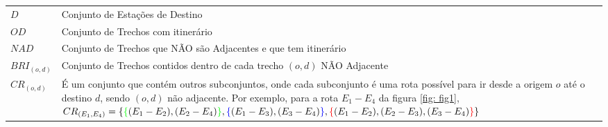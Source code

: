 \begin{table}[H]
\begin{tabular}{p{2cm} p{9.5cm} p{3.2cm}}
		$D$                & Conjunto de Estações de Destino                                                                                                                                                                                                                                                                                                                                                                                               &                                              \\
		$OD$               & Conjunto de Trechos com itinerário                                                                                                                                                                                                                                                                                                                                                                                            &                                              \\
		$NAD$              & \multicolumn{2}{p{12.7cm}}{Conjunto de Trechos que NÃO são Adjacentes e que tem itinerário}                                                                                                                                                                                                                                                                                                                                                                                  \\
		$BRI_{(o,d)}$      & \multicolumn{2}{p{12.7cm}}{Conjunto de Trechos contidos dentro de cada trecho $(o,d)$ NÃO Adjacente }                                                                                                                                                                                                                                                                                                                                                                        \\
		$CR_{(o,d)}$       & \multicolumn{2}{p{12.7cm}}{É um conjunto que contém outros subconjuntos, onde cada subconjunto é uma rota possível para ir desde a origem $o$ até o destino $d$, sendo $(o,d)$ não adjacente. Por exemplo, para a rota $E_1 - E_4$ da figura \ref{fig: fig1}, $CR_{(E_1,E_4)}=\{ \textcolor{green}{\{} (E_1-E_2),(E_2-E_4)\textcolor{green}{\}}, \textcolor{blue}{\{} (E_1-E_3),(E_3-E_4)\textcolor{blue}{\}}, \textcolor{red}{\{}(E_1-E_2),(E_2-E_3),(E_3-E_4) \textcolor{red}{\}} \} $}                                                                                                                                                                                                                                 \\

\end{tabular}
\end{table}
